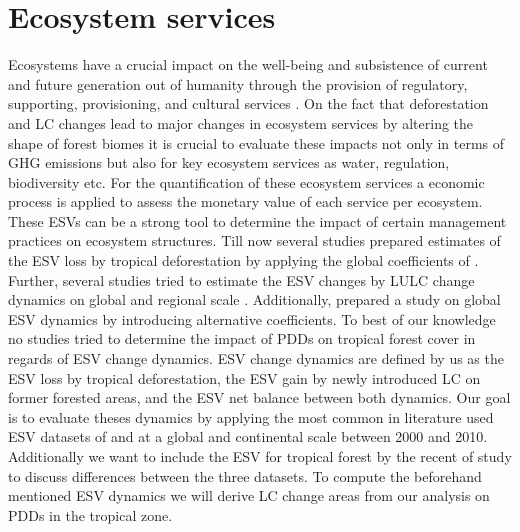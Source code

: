 	\section{Ecosystem services}
	\label{sec:ecosystem_services}
		Ecosystems have a crucial impact on the well-being and subsistence of current and future generation out of humanity through the provision of regulatory, supporting, provisioning, and cultural services \citep{Costanza1997}. On the fact that deforestation and \ac{LC} changes lead to major changes in ecosystem services by altering the shape of forest biomes it is crucial to evaluate these impacts not only in terms of \ac{GHG} emissions but also for key ecosystem services as water, regulation, biodiversity etc. For the quantification of these ecosystem services a economic process is applied to assess the monetary value of each service per ecosystem. These \acp{ESV} can be a strong tool to determine the impact of certain management practices on ecosystem structures. Till now several studies prepared estimates of the \ac{ESV} loss by tropical deforestation by applying the global coefficients of \citeauthor{Costanza2014} \citep{Song2018,Costanza2014}. Further, several studies tried to estimate the \ac{ESV} changes by \ac{LULC} change dynamics on global and regional scale \citep{Costanza1997,Sannigrahi2018,Wang2006,Kreuter2001,Zhao2004}. Additionally, \citet{Groot2012} prepared a study on global \ac{ESV} dynamics by introducing alternative coefficients. To best of our knowledge no studies tried to determine the impact of \acp{PDD} on tropical forest cover in regards of \ac{ESV} change dynamics. \ac{ESV} change dynamics are defined by us as the \ac{ESV} loss by tropical deforestation, the \ac{ESV} gain by newly introduced \ac{LC} on former forested areas, and the \ac{ESV} net balance between both dynamics. Our goal is to evaluate theses dynamics by applying the most common in literature used \ac{ESV} datasets of \citeauthor{Costanza2014} and \citeauthor{Groot2012} at a global and continental scale between 2000 and 2010. Additionally we want to include the \ac{ESV} for tropical forest by the recent of study \citet{Siikamaki2015} to discuss differences between the three datasets. To compute the beforehand mentioned \ac{ESV} dynamics we will derive \ac{LC} change areas from our analysis on \acp{PDD} in the tropical zone. 


